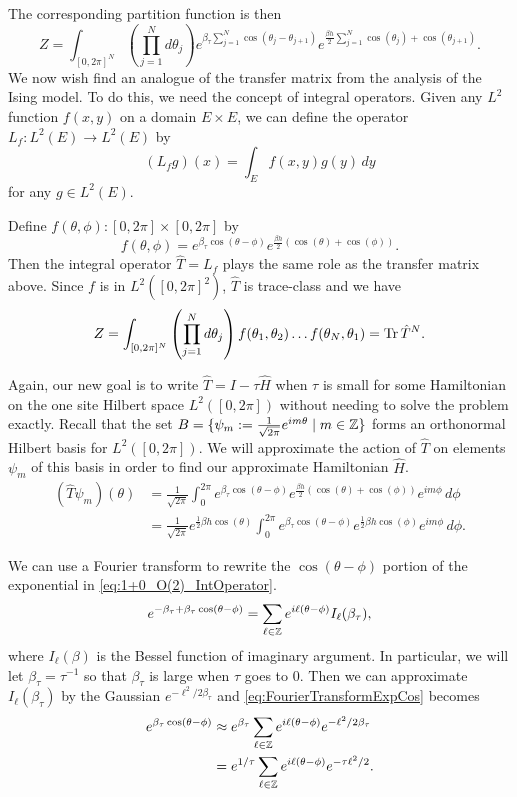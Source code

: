 \documentclass[10pt,reqno]{amsart}
\numberwithin{equation}{section}
\begin{document}
	The corresponding partition function is then
	\[ Z = \int_{[0,2\pi]^N} \left(\prod_{j=1}^N d\theta_j \right) e^{\beta_\tau \sum_{j=1}^N \cos(\theta_j-\theta_{j+1})} e^{\frac{\beta h}{2}  \sum_{j=1}^N \cos(\theta_j)+\cos(\theta_{j+1})}. \]
	We now wish find an analogue of the transfer matrix from the analysis of the Ising model.
	To do this, we need the concept of integral operators.
	Given any $L^2$ function $f(x,y)$ on a domain $E\times E$, we can define the operator $L_f : L^2(E) \to L^2(E)$ by 
	\[(L_f g)(x)=\int_E f(x,y)g(y)\, dy \]
	for any $g \in L^2(E)$.
	
	Define $f(\theta,\phi): [0,2\pi]\times [0,2\pi]$ by 
	\[f(\theta,\phi)=e^{\beta_\tau \cos(\theta -\phi)}e^{\frac{\beta h}{2}(\cos(\theta)+\cos(\phi))}. \]
	Then the integral operator $\hat{T}=L_f$ plays the same role as the transfer matrix above.
	Since $f$ is in $L^2([0,2\pi]^2)$, $\hat{T}$ is trace-class and we have
	\[Z= \int_{[0,2\pi]^N} \left(\prod_{j=1}^N d\theta_j \right) f(\theta_1,\theta_2)\ldots f(\theta_N,\theta_1) = \Tr \hat{T}^N. \]
	
	Again, our new goal is to write $\hat{T}=I-\tau\hat{H}$ when $\tau$ is small for some Hamiltonian on the one site Hilbert space $L^2([0,2\pi])$ without needing to solve the problem exactly. 
	Recall that the set $B=\{\psi_m:=\frac{1}{\sqrt{2\pi}} e^{im\theta} \mid m \in \mathbb{Z} \}$ forms an orthonormal Hilbert basis for $L^2([0,2\pi])$.
	We will approximate the action of $\hat{T}$ on elements $\psi_m$ of this basis in order to find our approximate Hamiltonian $\hat{H}$.
	\begin{align}
		(\hat{T}\psi_m)(\theta) &= \frac{1}{\sqrt{2\pi}}\int_{0}^{2\pi} e^{\beta_\tau \cos(\theta -\phi)}e^{\frac{\beta h}{2}(\cos(\theta)+\cos(\phi))} e^{im\phi}\, d\phi \nonumber \\
		&=\frac{1}{\sqrt{2\pi}}e^{\frac{1}{2}\beta h \cos(\theta)} \int_{0}^{2\pi} e^{\beta_\tau \cos(\theta -\phi)}e^{\frac{1}{2}\beta h \cos(\phi)}e^{im\phi}\, d\phi. \label{eq:1+0_O(2)_IntOperator}
	\end{align}
	
	We can use a Fourier transform to rewrite the $\cos(\theta-\phi)$ portion of the exponential in \cref{eq:1+0_O(2)_IntOperator}.
	\begin{equation}\label{eq:FourierTransformExpCos}
		e^{-\beta_\tau+\beta_\tau\cos(\theta-\phi)}=\sum_{\ell\in \mathbb{Z}}e^{i\ell(\theta-\phi)}I_\ell(\beta_\tau),
	\end{equation}
	where $I_\ell(\beta)$ is the Bessel function of imaginary argument.
	In particular, we will let $\beta_\tau=\tau^{-1}$ so that $\beta_\tau$ is large when $\tau$ goes to 0. 
	Then we can approximate $I_\ell(\beta_\tau)$ by the Gaussian $e^{-\ell^2/2\beta_\tau}$ and \cref{eq:FourierTransformExpCos} becomes
	\begin{align}
		e^{\beta_\tau\cos(\theta-\phi)}&\approx e^{\beta_\tau}\sum_{\ell\in \mathbb{Z}}e^{i\ell(\theta-\phi)}e^{-\ell^2/2\beta_\tau}\\
			&=e^{1/\tau}\sum_{\ell\in \mathbb{Z}}e^{i\ell(\theta-\phi)}e^{-\tau\ell^2/2}. \label{eq:FourierTransformExpCosApprox}
	\end{align}
	
\end{document}
